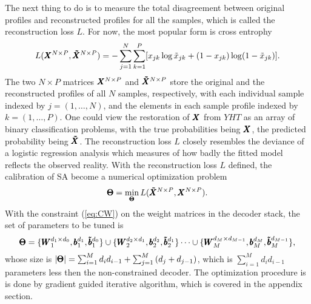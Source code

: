 The next thing to do is to measure the total disagreement between original profiles and reconstructed profiles for all the samples, which is called the reconstruction loss $L$. For now, the most popular form is cross entrophy
\newcommand{\XECD}{\XEC^{N \times P}}   %
\newcommand{\XDCD}{\XDC^{N \times P}}   %
\newcommand{\YHTD}{\YHT^{N \times P}}   %
\begin{equation} \label{eq:CE}
  L(\XECD, \XDCD) = -\sum_{j=1}^{N}{\sum_{k=1}^P[x_{jk}\log{\tilde{x}_{jk}}+(1-x_{jk})\log(1-\tilde{x}_{jk})]}.
\end{equation}
The two $N \times P$ matrices $\XECD$ and $\XDCD$ store the original and the reconstructed profiles of all $N$ samples, respectively, with each individual sample indexed by $j=(1, \dots, N)$, and the elements in each sample profile indexed by $k = (1, \dots, P)$. One could view the restoration of $\pmb{X}$ from $YHT$ as an array of binary classification problems, with the true probabilities being $\pmb{X}$, the predicted probability being $\pmb{\tilde{X}}$. The reconstruction loss $L$ closely resembles the deviance of a logistic regression analysis which measures of how badly the fitted model reflects the observed reality. With the reconstruction loss $L$ defined, the calibration of SA become a numerical optimization problem
\[ \Par = \min_{\Par} L(\XDCD, \XECD). \]
With the constraint (\ref{eq:CW}) on the weight matrices in the decoder stack, the set of parameters to be tuned is
\[ \pmb{\Theta} = \{\pmb{W}_{1}^{d_{1} \times d_{0}}, \pmb{b}_{1}^{d_{1}}, \pmb{\tilde{b}}_{1}^{d_{0}}\} \cup \{\pmb{W}_{2}^{d_{2} \times d_{1}}, \pmb{b}_{2}^{d_{2}}, \pmb{\tilde{b}}_{2}^{d_{1}}\} \dots \cup \{\pmb{W}_{M}^{d_{M} \times d_{M-1}}, \pmb{b}_{M}^{d_{M}}, \pmb{\tilde{b}}_{M}^{d_{M-1}}\}, \]
whose size is $|\pmb{\Theta}| = \sum_{i=1}^M{d_i d_{i-1}} + \sum_{j=1}^M{(d_j + d_{j-1})}$, which is $\sum_{i=1}^M{d_i d_{i-1}}$ parameters less then the non-constrained decoder. The optimization procedure is is done by gradient guided iterative algorithm, which is covered in the appendix section.


